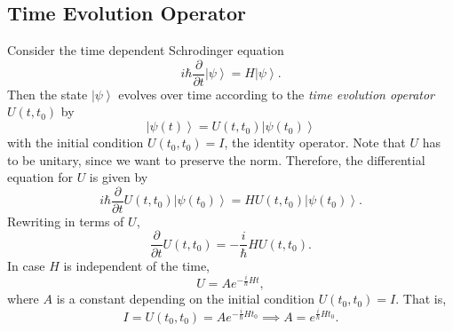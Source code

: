 \documentclass[phys334]{subfiles}
\begin{document}
    \subsection{Time Evolution Operator}

    Consider the time dependent Schrodinger equation
    \begin{equation*}
        i\hbar \frac{\partial}{\partial t} \left| \psi \right\rangle = H\left| \psi \right\rangle.
    \end{equation*}
    Then the state $\left| \psi \right\rangle$ evolves over time according to the \textit{time evolution operator} $U\left( t,t_0 \right)$ by
    \begin{equation*}
        \left| \psi\left( t \right) \right\rangle = U\left( t,t_0 \right) \left| \psi\left( t_0 \right) \right\rangle
    \end{equation*}
    with the initial condition $U\left( t_0,t_0 \right) = I$, the identity operator. Note that $U$ has to be unitary, since we want to preserve the norm. Therefore, the differential equation for $U$ is given by
    \begin{equation*}
        i\hbar \frac{\partial}{\partial t} U\left( t,t_0 \right)\left| \psi\left( t_0 \right) \right\rangle = HU\left( t,t_0 \right)\left| \psi\left( t_0 \right) \right\rangle.
    \end{equation*}
    Rewriting in terms of $U$,
    \begin{equation*}
        \frac{\partial}{\partial t} U\left( t,t_0 \right) = -\frac{i}{\hbar} HU\left( t,t_0 \right).
    \end{equation*}
    In case $H$ is independent of the time,
    \begin{equation*}
        U = Ae^{-\frac{i}{\hbar}Ht},
    \end{equation*}
    where $A$ is a constant depending on the initial condition $U\left( t_0,t_0 \right)=I$. That is,
    \begin{equation*}
        I = U\left( t_0,t_0 \right) = Ae^{-\frac{i}{\hbar}Ht_0} \implies A = e^{\frac{i}{\hbar}Ht_0}.
    \end{equation*}
\end{document}
